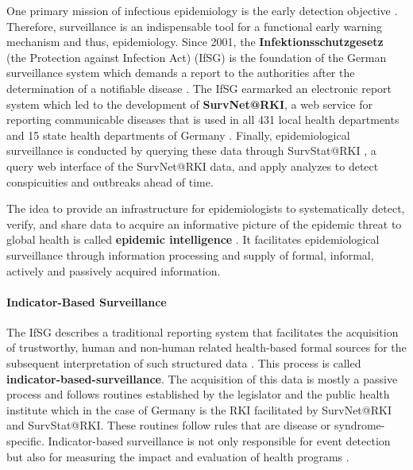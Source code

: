 One primary mission of infectious epidemiology is the early detection objective \citep{EarlyDetection}.
Therefore, surveillance is an indispensable tool for a functional early warning mechanism and thus, epidemiology.
Since 2001, the \textbf{Infektionsschutzgesetz} (the Protection against Infection Act) (\gls{IfSG})
is the foundation of the German surveillance system which demands a report to the authorities after the determination of a notifiable disease \citep{IfSG}.
The IfSG earmarked an electronic report system which led to the development of \textbf{SurvNet@RKI}, a web service for reporting communicable diseases that is used in all 431 local health departments and 15 state health departments of Germany \citep{Faensen2006}.
Finally, epidemiological surveillance is conducted by querying these data through SurvStat@RKI \citep{Faensen2004}, a query web interface of the SurvNet@RKI data, and apply analyzes to detect conspicuities and outbreaks ahead of time.

The idea to provide an infrastructure for epidemiologists to systematically detect, verify, and share data to acquire an informative picture of the epidemic threat to global health is called \textbf{epidemic intelligence} \citep{EarlyDetection}. It facilitates epidemiological surveillance through information processing and supply of formal, informal, actively and passively acquired information.

\paragraph{Indicator-Based Surveillance}
The IfSG describes a traditional reporting system that facilitates the acquisition of trustworthy, human and non-human related health-based formal sources for the subsequent interpretation of such structured data \citep{EarlyDetection}. This process is called \textbf{indicator-based-surveillance}.
The acquisition of this data is mostly a passive process and follows routines established by the legislator and the public health institute which in the case of Germany is the RKI facilitated by SurvNet@RKI and SurvStat@RKI.
These routines follow rules that are disease or syndrome-specific.
Indicator-based surveillance is not only responsible for event detection but also for measuring the impact and evaluation of health programs \citep{EarlyDetection}.

